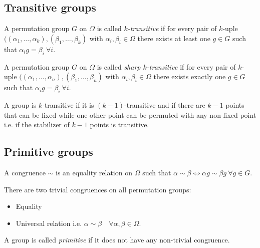 \subsection{Transitive groups}

\begin{definition}
  A permutation group $G$ on $\Omega$ is called \textit{$k$-transitive} if for every pair of $k$-uple $((\alpha_1, \dots, \alpha_k), (\beta_1, \dots, \beta_k)$ with $\alpha_i, \beta_i \in \Omega$ there exists at least one $g \in G$ such that $\alpha_i g = \beta_i \  \forall i$.
\end{definition}

\begin{definition}
  A permutation group $G$ on $\Omega$ is called \textit{sharp $k$-transitive} if for every pair of $k$-uple $((\alpha_1, \dots, \alpha_n), (\beta_1, \dots, \beta_n)$ with $\alpha_i, \beta_i \in \Omega$ there exists exactly one $g \in G$ such that $\alpha_i g = \beta_i \  \forall i$.
\end{definition}

\begin{property}
  \label{practical-transitivity}
  A group is $k$-transitive if it is $(k-1)$-transitive and if there are $k-1$ points that can be fixed while one other point can be permuted with any non fixed point i.e. if the stabilizer of $k-1$ points is transitive.
\end{property}

\subsection{Primitive groups}

\begin{definition}[Congruence]
  A congruence $\sim$ is an equality relation on $\Omega$ such that $\alpha \sim \beta \Leftrightarrow \alpha g \sim \beta g \ \forall g \in G$.
\end{definition}

There are two trivial congruences on all permutation groups:
\begin{itemize}
  \item Equality
  \item Universal relation i.e. $\alpha \sim \beta \quad \forall \alpha, \beta \in \Omega$.
\end{itemize}

\begin{definition}
  A group is called \textit{primitive} if it does not have any non-trivial congruence.
\end{definition}

